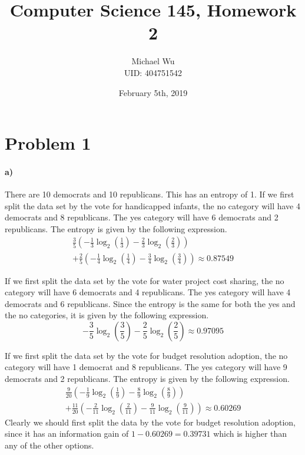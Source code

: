\documentclass[12pt]{article}
\begin{document}
\title{Computer Science 145, Homework 2}
\date{February 5th, 2019}
\author{Michael Wu\\UID: 404751542}
\maketitle

\section*{Problem 1}

\paragraph{a)}

There are 10 democrats and 10 republicans. This has an entropy of 1.
If we first split the data set by the vote for handicapped infants,
the no category will have 4 democrats and 8 republicans. The yes
category will have 6 democrats and 2 republicans. The entropy is
given by the following expression.
\begin{multline*}
    \frac{3}{5}\left(-\frac{1}{3}\log_2\left(\frac{1}{3}\right)-\frac{2}{3}\log_2\left(\frac{2}{3}\right)\right)\\
    +\frac{2}{5}\left(-\frac{1}{4}\log_2\left(\frac{1}{4}\right)-\frac{3}{4}\log_2\left(\frac{3}{4}\right)\right)\approx 0.87549
\end{multline*}

If we first split the data set by the vote for water project cost
sharing, the no category will have 6 democrats and 4 republicans.
The yes category will have 4 democrats and 6 republicans. Since
the entropy is the same for both the yes and the no categories,
it is given by the following expression.
\[-\frac{3}{5}\log_2\left(\frac{3}{5}\right)-\frac{2}{5}\log_2\left(\frac{2}{5}\right)\approx 0.97095\]

If we first split the data set by the vote for budget resolution
adoption, the no category will have 1 democrat and 8 republicans.
The yes category will have 9 democrats and 2 republicans.
The entropy is given by the following expression.
\begin{multline*}
    \frac{9}{20}\left(-\frac{1}{9}\log_2\left(\frac{1}{9}\right)-\frac{8}{9}\log_2\left(\frac{8}{9}\right)\right)\\
    +\frac{11}{20}\left(-\frac{2}{11}\log_2\left(\frac{2}{11}\right)-\frac{9}{11}\log_2\left(\frac{9}{11}\right)\right)\approx 0.60269
\end{multline*}
Clearly we should first split the data by the vote for budget resolution adoption,
since it has an information gain of \(1-0.60269=0.39731\) which is higher than any of the other options.
\end{document}

